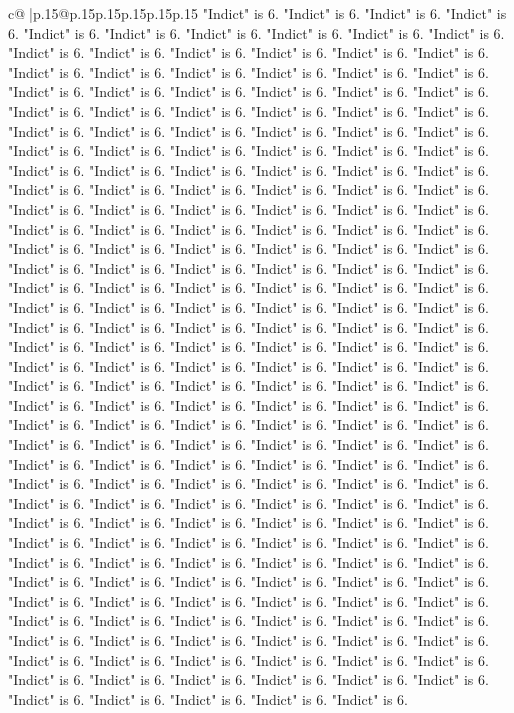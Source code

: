 \documentclass{article}
\begin{document}
{\begin{supertabular}{c@{$\;$}|p{.15\linewidth}@{}p{.15\linewidth}p{.15\linewidth}p{.15\linewidth}p{.15\linewidth}p{.15\linewidth}}
{{{"Indict" is 6. "Indict" is 6. "Indict" is 6. "Indict" is 6. "Indict" is 6. "Indict" is 6. "Indict" is 6. "Indict" is 6. "Indict" is 6. "Indict" is 6. "Indict" is 6. "Indict" is 6. "Indict" is 6. "Indict" is 6. "Indict" is 6. "Indict" is 6. "Indict" is 6. "Indict" is 6. "Indict" is 6. "Indict" is 6. "Indict" is 6. "Indict" is 6. "Indict" is 6. "Indict" is 6. "Indict" is 6. "Indict" is 6. "Indict" is 6. "Indict" is 6. "Indict" is 6. "Indict" is 6. "Indict" is 6. "Indict" is 6. "Indict" is 6. "Indict" is 6. "Indict" is 6. "Indict" is 6. "Indict" is 6. "Indict" is 6. "Indict" is 6. "Indict" is 6. "Indict" is 6. "Indict" is 6. "Indict" is 6. "Indict" is 6. "Indict" is 6. "Indict" is 6. "Indict" is 6. "Indict" is 6. "Indict" is 6. "Indict" is 6. "Indict" is 6. "Indict" is 6. "Indict" is 6. "Indict" is 6. "Indict" is 6. "Indict" is 6. "Indict" is 6. "Indict" is 6. "Indict" is 6. "Indict" is 6. "Indict" is 6. "Indict" is 6. "Indict" is 6. "Indict" is 6. "Indict" is 6. "Indict" is 6. "Indict" is 6. "Indict" is 6. "Indict" is 6. "Indict" is 6. "Indict" is 6. "Indict" is 6. "Indict" is 6. "Indict" is 6. "Indict" is 6. "Indict" is 6. "Indict" is 6. "Indict" is 6. "Indict" is 6. "Indict" is 6. "Indict" is 6. "Indict" is 6. "Indict" is 6. "Indict" is 6. "Indict" is 6. "Indict" is 6. "Indict" is 6. "Indict" is 6. "Indict" is 6. "Indict" is 6. "Indict" is 6. "Indict" is 6. "Indict" is 6. "Indict" is 6. "Indict" is 6. "Indict" is 6. "Indict" is 6. "Indict" is 6. "Indict" is 6. "Indict" is 6. "Indict" is 6. "Indict" is 6. "Indict" is 6. "Indict" is 6. "Indict" is 6. "Indict" is 6. "Indict" is 6. "Indict" is 6. "Indict" is 6. "Indict" is 6. "Indict" is 6. "Indict" is 6. "Indict" is 6. "Indict" is 6. "Indict" is 6. "Indict" is 6. "Indict" is 6. "Indict" is 6. "Indict" is 6. "Indict" is 6. "Indict" is 6. "Indict" is 6. "Indict" is 6. "Indict" is 6. "Indict" is 6. "Indict" is 6. "Indict" is 6. "Indict" is 6. "Indict" is 6. "Indict" is 6. "Indict" is 6. "Indict" is 6. "Indict" is 6. "Indict" is 6. "Indict" is 6. "Indict" is 6. "Indict" is 6. "Indict" is 6. "Indict" is 6. "Indict" is 6. "Indict" is 6. "Indict" is 6. "Indict" is 6. "Indict" is 6. "Indict" is 6. "Indict" is 6. "Indict" is 6. "Indict" is 6. "Indict" is 6. "Indict" is 6. "Indict" is 6. "Indict" is 6. "Indict" is 6. "Indict" is 6. "Indict" is 6. "Indict" is 6. "Indict" is 6. "Indict" is 6. "Indict" is 6. "Indict" is 6. "Indict" is 6. "Indict" is 6. "Indict" is 6. "Indict" is 6. "Indict" is 6. "Indict" is 6. "Indict" is 6. "Indict" is 6. "Indict" is 6. "Indict" is 6. "Indict" is 6. "Indict" is 6. "Indict" is 6. "Indict" is 6. "Indict" is 6. "Indict" is 6. "Indict" is 6. "Indict" is 6. "Indict" is 6. "Indict" is 6. "Indict" is 6. "Indict" is 6. "Indict" is 6. "Indict" is 6. "Indict" is 6. "Indict" is 6. "Indict" is 6. "Indict" is 6. "Indict" is 6. "Indict" is 6. "Indict" is 6. "Indict" is 6. "Indict" is 6. "Indict" is 6. "Indict" is 6. "Indict" is 6. "Indict" is 6. "Indict" is 6. "Indict" is 6. "Indict" is 6. "Indict" is 6. "Indict" is 6. "Indict" is 6. "Indict" is 6. "Indict" is 6. "Indict" is 6. "Indict" is 6. "Indict" is 6. "Indict" is 6. "Indict" is 6. "Indict" is 6. "Indict" is 6. "Indict" is 6. }}}
\end{supertabular}}
\end{document}

